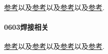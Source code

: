 \documentclass[hidelinks]{ctexart}
\begin{document}
\href{https://juejin.im/post/5cfe21576fb9a07ec07fb453}{参考}以及\href{https://www.jianshu.com/p/1d60f6767838}{参考}以及\href{http://www.nixieclock.org/}{参考}以及\href{https://zhuanlan.zhihu.com/p/28265652}{参考}.

\paragraph{0603焊接相关} %
\label{par:0603焊接相关}

\href{https://www.google.com/search?q=0603+%E7%84%8A%E6%8E%A5&oq=0603+%E7%84%8A%E6%8E%A5&aqs=chrome..69i57j35i39j0l2.3202j0j7&client=ms-android-huawei-rev1&sourceid=chrome-mobile&ie=UTF-8}{参考}以及\href{https://www.bilibili.com/video/av61326678/}{参考}以及\href{https://www.bilibili.com/video/av67495863/}{参考}以及\href{https://www.bilibili.com/video/BV1iJ411i7y6?from=search&seid=501857367124339998}{参考}.

\end{document}
